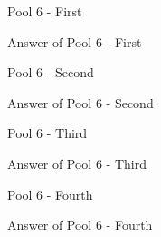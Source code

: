 \begin{question}
Pool 6 - First
\end{question}
\begin{solution}
Answer of Pool 6 - First
\end{solution}

\begin{question}
Pool 6 - Second
\end{question}
\begin{solution}
Answer of Pool 6 - Second
\end{solution}

\begin{question}
Pool 6 - Third
\end{question}
\begin{solution}
Answer of Pool 6 - Third
\end{solution}

\begin{question}
Pool 6 - Fourth
\end{question}
\begin{solution}
Answer of Pool 6 - Fourth
\end{solution}
